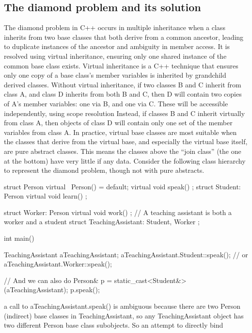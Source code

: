 \documentclass{report}
\begin{document}
\subsection{The diamond problem and its solution}
\bigbreak \noindent 
The diamond problem in C++ occurs in multiple inheritance when a class inherits from two base classes that both derive from a common ancestor, leading to duplicate instances of the ancestor and ambiguity in member access. It is resolved using virtual inheritance, ensuring only one shared instance of the common base class exists.
\bigbreak \noindent 
Virtual inheritance is a C++ technique that ensures only one copy of
a base class’s member variables is inherited by grandchild derived
classes. Without virtual inheritance, if two classes B and C inherit
from class A, and class D inherits from both B and C, then D will
contain two copies of A’s member variables: one via B, and one via
C. These will be accessible independently, using scope resolution
\bigbreak \noindent 
Instead, if classes B and C inherit virtually from class A, then
objects of class D will contain only one set of the member variables
from class A.
\bigbreak \noindent 
In practice, virtual base classes are most suitable when the classes
that derive from the virtual base, and especially the virtual base
itself, are pure abstract classes. This means the classes above the
“join class” (the one at the bottom) have very little if any data.
\bigbreak \noindent 
Consider the following class hierarchy to represent the diamond
problem, though not with pure abstracts.
\bigbreak \noindent 
\begin{cppcode}
    struct Person {
        virtual ~Person() = default;
        virtual void speak() {}
    };
    struct Student: Person {
        virtual void learn() {}
    };

    struct Worker: Person {
        virtual void work() {}
    }; // A teaching assistant is both a worker and a student
    struct TeachingAssistant: Student, Worker {};

    int main() {
        TeachingAssistant aTeachingAssistant;
        aTeachingAssistant.Student::speak();
        // or
        aTeachingAssistant.Worker::speak();

        // And we can also do
        Person& p = static_cast<Student&>(aTeachingAssistant);
        p.speak();
    }
\end{cppcode}
\bigbreak \noindent 
a call to aTeachingAssistant.speak() is ambiguous because there are two Person (indirect) base classes in
TeachingAssistant, so any TeachingAssistant object has two different Person base class subobjects. So an attempt to directly bind
\end{document}
